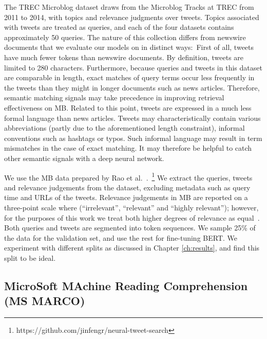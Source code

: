 The TREC Microblog dataset draws from the Microblog Tracks at TREC from 2011 to 2014, with topics and relevance judgments over tweets.
Topics associated with tweets are treated as queries, and each of the four datasets contains approximately 50 queries.
The nature of this collection differs from newswire documents that we evaluate our models on in distinct ways:\
First of all, tweets have much fewer tokens than newswire documents.
By definition, tweets are limited to 280 characters.
Furthermore, because queries and tweets in this dataset are comparable in length, exact matches of query terms occur less frequently in the tweets than they might in longer documents such as news articles.
Therefore, semantic matching signals may take precedence in improving retrieval effectiveness on MB.
Related to this point, tweets are expressed in a much less formal language than news articles.
Tweets may characteristically contain various abbreviations (partly due to the aforementioned length constraint), informal conventions such as hashtags or typos.
Such informal language may result in term mismatches in the case of exact matching.
It may therefore be helpful to catch other semantic signals with a deep neural network.

We use the MB data prepared by Rao et al.~\cite{rao2019tweet}.~\footnote{https://github.com/jinfengr/neural-tweet-search}
We extract the queries, tweets and relevance judgements from the dataset, excluding metadata such as query time and URLs of the tweets.
Relevance judgements in MB are reported on a three-point scale where (``irrelevant'', ``relevant'' and ``highly relevant''); however, for the purposes of this work we treat both higher degrees of relevance as equal~\cite{ounisoverview}.
Both queries and tweets are segmented into token sequences.
We sample 25\% of the data for the validation set, and use the rest for fine-tuning BERT.
We experiment with different splits as discussed in Chapter \ref{ch:results}, and find this split to be ideal.

\subsection{MicroSoft MAchine Reading Comprehension (MS MARCO)}

